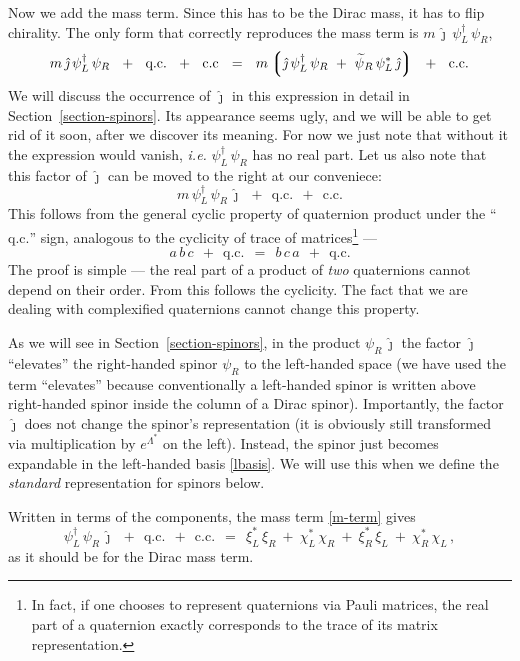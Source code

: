 \documentclass[epsfig,12pt]{article}
\newcommand{\wt}{\widetilde}
\newcommand{\lgr}{\left\lgroup}
\newcommand{\rgr}{\right\rgroup}
\newcommand{\jj}{\hat\jmath}
\begin{document}
	Now we add the mass term.
	Since this has to be the Dirac mass, it has to flip chirality.
	The only form that correctly reproduces the mass term is $ m\, \jj\, \psi_L^\dag\, \psi_R $,
\begin{equation}
	m\, \jj\, \psi_L^\dag\, \psi_R  ~~+~~  \text{q.c.}  ~~+~~  \text{c.c}  ~~=~~
	m \lgr \jj\, \psi_L^\dag\, \psi_R  ~+~  \wt\psi{}_R\, \psi_L^*\, \jj \rgr
	~~+~~  \text{c.c.}
\end{equation}
	We will discuss the occurrence of $ \jj $ in this expression in detail in Section~\ref{section-spinors}.
	Its appearance seems ugly, and we will be able to get rid of it soon, after we discover its meaning.
	For now we just note that without it the expression would vanish, \emph{i.e.} $ \psi_L^\dag\, \psi_R $
	has no real part.
	Let us also note that this factor of $ \jj $ can be moved to the right at our conveniece:
\begin{equation}
\label{m-term}
	m\, \psi_L^\dag\, \psi_R\, \jj  ~~+~~  \text{q.c.}  ~~+~~  \text{c.c.}
\end{equation}
	This follows from the general cyclic property of quaternion product
	under the ``$ \text{q.c.} $'' sign, analogous to the cyclicity of trace of matrices\footnote{
		In fact, if one chooses to represent quaternions via Pauli matrices, the real
		part of a quaternion exactly corresponds to the trace of its matrix representation.
	} ---
\begin{equation}
	a\, b\, c  ~~+~~  \text{q.c.}	~~=~~	b\, c\, a  ~~+~~  \text{q.c.}
\end{equation}
	The proof is simple --- the real part of a product of \emph{two} quaternions cannot depend
	on their order.
	From this follows the cyclicity.
	The fact that we are dealing with complexified quaternions cannot change this property.

	As we will see in Section~\ref{section-spinors}, in the product $ \psi_R\, \jj $ the factor $ \jj $
	``elevates'' the right-handed spinor $ \psi_R $ to the left-handed space
	(we have used the term ``elevates'' because conventionally a left-handed spinor is
	written above right-handed spinor inside the column of a Dirac spinor).
	Importantly, the factor $ \jj $ does not change the spinor's representation (it is obviously still transformed
	via multiplication by $ e^{\Lambda^*} $ on the left).
	Instead, the spinor just becomes expandable in the left-handed basis \eqref{lbasis}.
	We will use this when we define the \emph{standard} representation for spinors below.

	Written in terms of the components, the mass term \eqref{m-term} gives
\begin{equation}
	\psi_L^\dag\, \psi_R\, \jj  ~~+~~  \text{q.c.}  ~~+~~  \text{c.c.}	~~=~~
	\xi_L^*\,\xi_R  ~+~ \chi_L^*\,\chi_R  ~+~  \xi_R^*\,\xi_L  ~+~ \chi_R^*\,\chi_L\,,
\end{equation}
	as it should be for the Dirac mass term.
\end{document}
